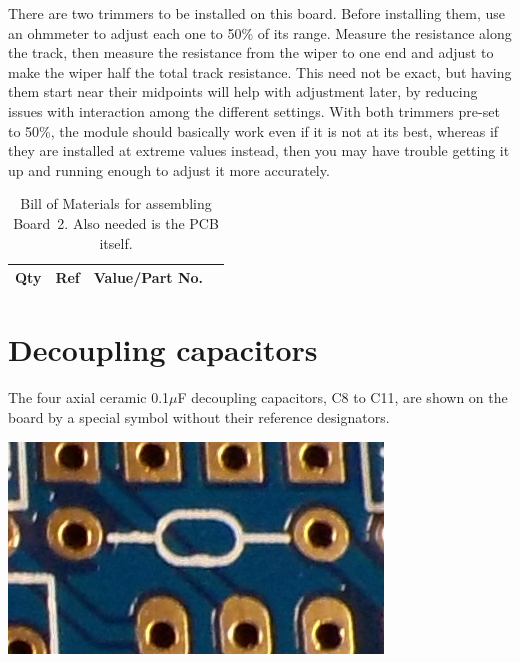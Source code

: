 There are two trimmers to be installed on this board.  Before
installing them, use an ohmmeter to adjust each one to 50\% of its range. 
Measure the resistance along the track, then measure the resistance from the
wiper to one end and adjust to make the wiper half the total track
resistance.  This need not be exact, but having them start near their
midpoints will help with adjustment later,
by reducing issues with interaction among the different settings.  With both
trimmers pre-set to 50\%, the module should basically work even if it is not
at its best, whereas if they are installed at extreme values instead, then
you may have trouble getting it up and running enough to adjust it more
accurately.

\begin{table}
{\centering
{}
\vspace{\baselineskip}

\begin{tabular}{rp{1.3in}cp{3in}}
  \textbf{Qty} & \textbf{Ref} & \textbf{Value/Part No.} & \\ \hline

\end{tabular}\par}
\caption{Bill of Materials for assembling Board~2.  Also needed is the PCB
itself.}\label{tab:b2bom}
\end{table}

\section{Decoupling capacitors}

The four axial ceramic 0.1$\mu$F decoupling capacitors, C8 to C11, are shown
on the board by a special symbol without their reference designators.

\nopagebreak
\noindent\includegraphics[width=\linewidth]{decoup-symbol.jpg}

